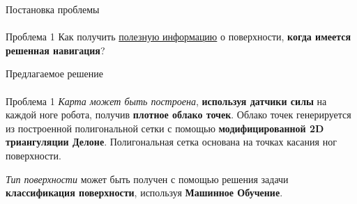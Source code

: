 \documentclass[aspectratio=169,xcolor=table]{beamer}
\begin{document}

\begin{frame}[t]{Постановка проблемы}
    \framesubtitle{}
    \begin{block}{Проблема 1}
        \large
        Как получить \underline{полезную информацию} о поверхности, \textbf{когда имеется решенная навигация}?
        \vspace{5pt}

    \end{block}
\end{frame}

\begin{frame}[t]{Предлагаемое решение}
    \framesubtitle{}
    \begin{exampleblock}{Проблема 1}
        \large
        \textit{Карта может быть построена}, \textbf{используя датчики силы} на каждой ноге робота, получив \textbf{плотное облако точек}. Облако точек генерируется из построенной полигональной сетки с помощью \textbf{модифицированной 2D триангуляции Делоне}. Полигональная сетка основана на точках касания ног поверхности.
        \vspace{5pt}

        \textit{Тип поверхности} может быть получен с помощью решения задачи \textbf{классификация поверхности}, используя \textbf{Машинное Обучение}.
    \end{exampleblock}
\end{frame}

\end{document}
